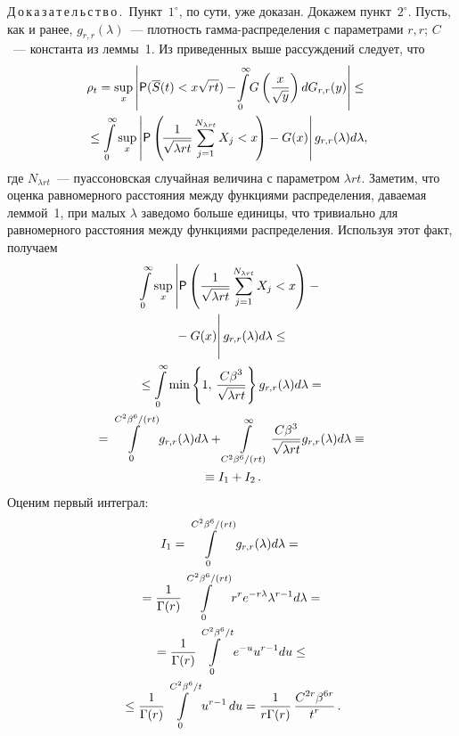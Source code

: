 \begin{multicols}{2}
\noindent
Д\,о\,к\,а\,з\,а\,т\,е\,л\,ь\,с\,т\,в\,о\,.~Пункт~$1^{\circ}$, по сути, уже
доказан. Докажем пункт~$2^{\circ}$. Пусть, как и ранее,
$g_{r,r}(\lambda)$~--- плотность гам\-ма-рас\-пре\-де\-ле\-ния с параметрами
$r,r$; $C$~--- константа из леммы~1. Из приведенных выше рассуждений
следует, что
\begin{multline*}
\hspace*{-6pt}\rho_t=\sup\limits_x\left\vert{\sf P}(\overline
S(t)<x\sqrt{rt})-\!\int\limits_{0}^{\infty}\!
G\left(\fr{x}{\sqrt{y}}\right)dG_{r,r}(y)\right\vert\le{}
\\
\hspace*{-6pt}{}\le \int\limits_0^{\infty}\sup\limits_x \left\vert{\sf
P}\left(\!\fr{1}{\sqrt{\lambda rt}}\sum\limits_{j=1}^{N_{\lambda rt}}X_j<x
\!\right)-G(x)\right\vert g_{r,r}(\lambda)d\lambda,
\end{multline*}
где $N_{\lambda rt}$~--- пуассоновская случайная величина с
параметром $\lambda rt$. Заметим, что оценка равномерного расстояния
между функциями распределения, даваемая леммой~1, при малых
$\lambda$ заведомо больше единицы, что тривиально для равномерного
расстояния между функциями распределения. Используя этот факт,
получаем
\begin{multline*}
\int\limits_0^{\infty}\sup\limits_x \left\vert{\sf P}\left(\fr{1}{\sqrt{\lambda
rt}}\sum\limits_{j=1}^{N_{\lambda rt}}X_j<x
\right)-{}\right.\\
\left.{}-G(x)\vphantom{\sum\limits_{j=1}^N}\right\vert g_{r,r}(\lambda)d\lambda\le{}\\
{}\le
\int\limits_0^{\infty} \min\left\{1,\, \fr{C\beta^3}{\sqrt{\lambda
r t}}\right\} g_{r,r}(\lambda) d\lambda={}
\\
{}=\int\limits_0^{C^2\beta^6/(rt)}g_{r,r}(\lambda)
d\lambda+\int\limits_{C^2\beta^6/(rt)}^{\infty}\fr{C\beta^3}{\sqrt{\lambda
r t}} g_{r,r}(\lambda) d\lambda \equiv{}\\
{}\equiv I_1+I_2\,.
\end{multline*}
Оценим первый интеграл:
\begin{multline*}
I_1 =\int\limits_0^{C^2\beta^6/(rt)}g_{r,r}(\lambda)
d\lambda={}\\
{}=\displaystyle\frac{\displaystyle 1\mathstrut}{\displaystyle \Gamma(r)\mathstrut}\int\limits_0^{C^2\beta^6/(rt)}r^r
e^{-r\lambda} \lambda^{r-1}d\lambda={}
\\
{}=\displaystyle\frac{\displaystyle 1\mathstrut}{\displaystyle \Gamma(r)\mathstrut}\int\limits_0^{C^2\beta^6/t}e^{-u}u^{r-1}du \le{}\\
{}\le
\displaystyle\frac{\displaystyle 1\mathstrut}{\displaystyle \Gamma(r)\mathstrut}\int\limits_0^{C^2\beta^6/t}u^{r-1}\,du
=\displaystyle\frac{\displaystyle 1\mathstrut}{\displaystyle r\Gamma(r)\mathstrut}\,\displaystyle\frac{\displaystyle C^{2r}\beta^{6r}\mathstrut}{\displaystyle t^r\mathstrut}\,.
\end{multline*}

\end{multicols}
